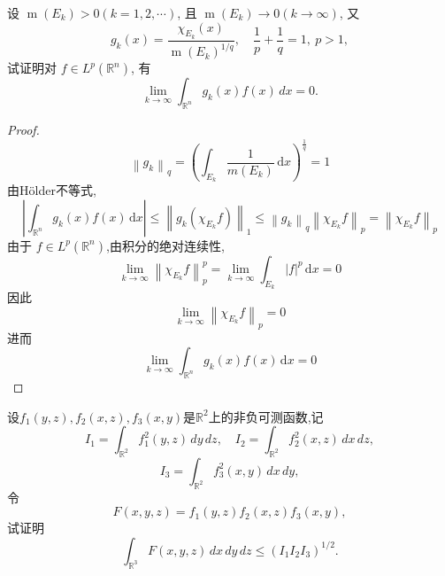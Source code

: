 \documentclass[../main.tex]{subfiles}
\begin{document}
\begin{exercise}{}{}
设 $\operatorname{m}(E_k)>0(k=1,2,\cdots)$, 且 $\operatorname{m}(E_k)\to0(k\to\infty)$, 又
\[
g_k(x)=\frac{\chi_{E_k}(x)}{\operatorname{m}(E_k)^{1/q}},\quad \frac1p+\frac1q=1,\ p>1,
\]
试证明对 $f\in L^p(\mathbb{R}^n)$, 有
\[
\lim_{k\to\infty}\int_{\mathbb{R}^n}g_k(x)f(x)\,dx=0.
\]
\end{exercise}
\begin{proof}
     \[
     \left\| g_{k} \right\|_{q}=\left(  \int_{E_{k}}\frac{1 }{m\left( E_{k} \right)  }\,\mathrm{d} x \right)^{\frac{1}{q}}= 1  
     \]由H\"older不等式,  \[
    \left|  \int_{\mathbb{R} ^{n}}g_{k}\left( x \right)f\left( x \right)\,\mathrm{d} x \right| \le \left\| g_{k}\left(  \chi _{E_{k}}f  \right) \right\|_{1}\le \left\| g_{k} \right\|_{q}\left\| \chi _{E_{k}}f \right\|_{p}  = \left\| \chi _{E_{k}}f \right\|_{p}
     \]由于 \(  f\in L^{p}\left( \mathbb{R} ^{n} \right)   \),由积分的绝对连续性,  \[
  \lim_{k\to \infty}\left\| \chi _{E_{k}}f \right\|_{p}^{p}=    \lim_{k\to \infty}\int_{E_{k}}\left| f \right|^{p}\,\mathrm{d} x= 0 
     \]因此 \[
     \lim_{k\to \infty}\left\| \chi _{E_{k}}f \right\|_{p}= 0
     \]进而 \[
     \lim_{k\to \infty}\int_{\mathbb{R} ^{n}}g_{k}\left( x \right)f\left( x \right)\,\mathrm{d} x= 0  
     \]
\end{proof}
\begin{exercise}{}{}
设\(f_1(y,z),f_2(x,z),f_3(x,y)\)是\(\mathbb R^2\)上的非负可测函数,记
\[
I_1=\int_{\mathbb R^2}f_1^2(y,z)\,dy\,dz,\quad
I_2=\int_{\mathbb R^2}f_2^2(x,z)\,dx\,dz,
\]
\[
I_3=\int_{\mathbb R^2}f_3^2(x,y)\,dx\,dy,
\]
令
\[
F(x,y,z)=f_1(y,z)f_2(x,z)f_3(x,y),
\]
试证明
\[
\int_{\mathbb R^3}F(x,y,z)\,dx\,dy\,dz\le (I_1I_2I_3)^{1/2}.
\]
\end{exercise} 
\end{document}
